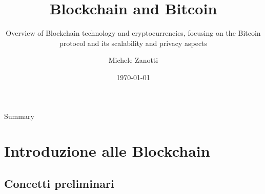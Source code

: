 \documentclass{beamer}
\title{Blockchain and Bitcoin}
\subtitle[]{Overview of Blockchain technology and cryptocurrencies, focusing on
the Bitcoin protocol and its scalability and privacy aspects}
\institute[]{Università degli studi di Brescia}
\author{Michele Zanotti}
\date{\today}
\begin{document}
  \begin{frame}
    \titlepage
  \end{frame}
  \begin{frame}{Summary}
    \frametitle{\contentsname}
    \begin{multicols}{2}
        \tableofcontents
    \end{multicols}
  \end{frame}





  \section{Introduzione alle Blockchain}
  \subsection{Concetti preliminari}





\end{document}

